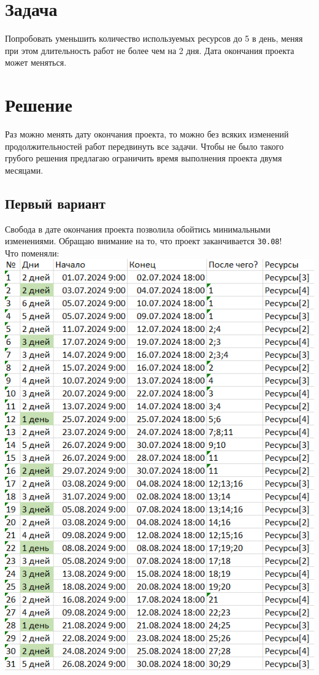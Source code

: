 \documentclass[14pt]{article}
\begin{document}
\section{Задача}
	Попробовать уменьшить количество используемых ресурсов до 5 в день,
		меняя при этом длительность работ не более чем на 2 дня.
	Дата окончания проекта может меняться.
\section{Решение}
	Раз можно менять дату окончания проекта, то можно без всяких изменений продолжительностей работ передвинуть все задачи.
	Чтобы не было такого грубого решения предлагаю ограничить время выполнения проекта двумя месяцами.
	\subsection{Первый вариант}
		Свобода в дате окончания проекта позволила обойтись минимальными изменениями.
		Обращаю внимание на то, что проект заканчивается \texttt{30.08}!\\
		{\LARGE Что поменяли:}\\
		\includegraphics[height=0.6\textheight]{../img/2a1_days_change.png}\\ 
\end{document}
